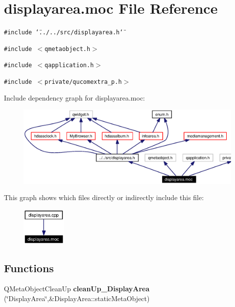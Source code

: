 \section{displayarea.moc File Reference}
\label{displayarea_8moc}


{\tt \#include \char`\"{}../../src/displayarea.h\char`\"{}}\par
{\tt \#include $<$qmetaobject.h$>$}\par
{\tt \#include $<$qapplication.h$>$}\par
{\tt \#include $<$private/qucomextra\_\-p.h$>$}\par


Include dependency graph for displayarea.moc:\begin{figure}[H]
\begin{center}
\leavevmode
\includegraphics[width=343pt]{displayarea_8moc__incl}
\end{center}
\end{figure}


This graph shows which files directly or indirectly include this file:\begin{figure}[H]
\begin{center}
\leavevmode
\includegraphics[width=62pt]{displayarea_8moc__dep__incl}
\end{center}
\end{figure}
\subsection*{Functions}
\begin{CompactItemize}
\item 
QMeta\-Object\-Clean\-Up {\bf clean\-Up\_\-Display\-Area} (\char`\"{}Display\-Area\char`\"{},\&Display\-Area::static\-Meta\-Object)
\end{CompactItemize}


